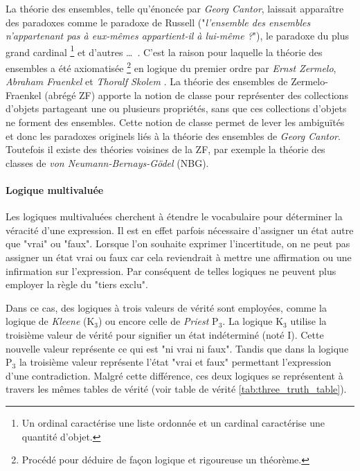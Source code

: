 \begin{refsegment}
\begin{shadedfigure}[H]
    \end{shadedfigure}

    La théorie des ensembles, telle qu'énoncée par \textit{Georg Cantor}, laissait apparaître des paradoxes comme le paradoxe de Russell ("\textit{l'ensemble des ensembles n'appartenant pas à eux-mêmes appartient-il à lui-même ?}"), le paradoxe du plus grand cardinal \footnote{Un ordinal caractérise une liste ordonnée et un cardinal caractérise une quantité d'objet.} et d'autres \ldots~. C’est la raison pour laquelle la théorie des ensembles a été axiomatisée \footnote{Procédé pour déduire de façon logique et rigoureuse un théorème.} en logique du premier ordre par \textit{Ernst Zermelo}, \textit{ Abraham Fraenkel} et \textit{Thoralf Skolem} \cite{hayden1968zermelo,kanamori2008higher}. La théorie des ensembles de Zermelo-Fraenkel (abrégé ZF) apporte la notion de classe pour représenter des collections d'objets partageant une ou plusieurs propriétés, sans que ces collections d’objets ne forment des ensembles. Cette notion de classe permet de lever les ambiguïtés et donc les paradoxes originels liés à la théorie des ensembles de \textit{Georg Cantor}. Toutefois il existe des théories voisines de la ZF, par exemple la théorie des classes \cite{bernays1937system,van1967frege} de \textit{von Neumann-Bernays-Gödel} (NBG).

        
    \paragraph{Logique multivaluée}\label{par:logic_multivalued}
    
    Les logiques multivaluées cherchent à étendre le vocabulaire pour déterminer la véracité d'une expression.  Il est en effet parfois nécessaire d'assigner un état autre que "vrai" ou "faux". Lorsque l'on souhaite exprimer l'incertitude, on ne peut pas assigner un état vrai ou faux car cela reviendrait à mettre une affirmation ou une infirmation sur l'expression. Par conséquent de telles logiques ne peuvent plus employer la règle du "tiers exclu".
    
    Dans ce cas, des logiques à trois valeurs de vérité sont employées, comme la logique de \textit{Kleene} (K$_{3}$) ou encore celle de \textit{Priest} P$_{3}$. La logique K$_{3}$ utilise la troisième valeur de vérité pour signifier un état indéterminé (noté I).  Cette nouvelle valeur représente ce qui est "ni vrai ni faux".  Tandis que dans la logique P$_{3}$ la troisième valeur représente l'état "vrai et faux" permettant l'expression d'une contradiction. Malgré cette différence, ces deux logiques se représentent à travers les mêmes tables de vérité (voir table de vérité \ref{tab:three_truth_table}).
    

\end{refsegment}
